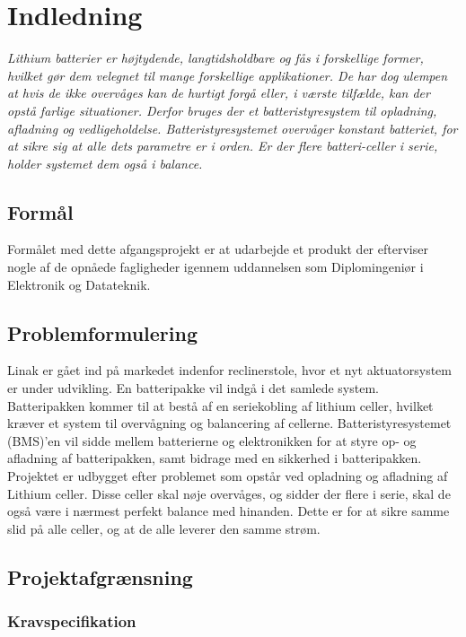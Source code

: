\chapter{Indledning}

\emph{Lithium batterier er højtydende, langtidsholdbare og fås i forskellige former, hvilket gør dem velegnet til mange forskellige applikationer. De har dog ulempen at hvis de ikke overvåges kan de hurtigt forgå eller, i værste tilfælde, kan der opstå farlige situationer. Derfor bruges der et batteristyresystem til opladning, afladning og vedligeholdelse. Batteristyresystemet overvåger konstant batteriet, for at sikre sig at alle dets parametre er i orden. Er der flere batteri-celler i serie, holder systemet dem også i balance. }

\section{Formål}
Formålet med dette afgangsprojekt er at udarbejde et produkt der efterviser nogle af de opnåede fagligheder igennem uddannelsen som Diplomingeniør i Elektronik og Datateknik.

\section{Problemformulering}
Linak er gået ind på markedet indenfor reclinerstole, hvor et nyt aktuatorsystem er under udvikling. En batteripakke vil indgå i det samlede system. Batteripakken kommer til at bestå af en seriekobling af lithium celler, hvilket kræver et system til overvågning og balancering af cellerne. Batteristyresystemet (BMS)’en vil sidde mellem batterierne og elektronikken for at styre op- og afladning af batteripakken, samt bidrage med en sikkerhed i batteripakken. \\

Projektet er udbygget efter problemet som opstår ved opladning og afladning af Lithium celler. Disse celler skal nøje overvåges, og sidder der flere i serie, skal de også være i nærmest perfekt balance med hinanden. Dette er for at sikre samme slid på alle celler, og at de alle leverer den samme strøm. 

\section{Projektafgrænsning}
\subsection{Kravspecifikation} \label{afs:kravspecifikation}

